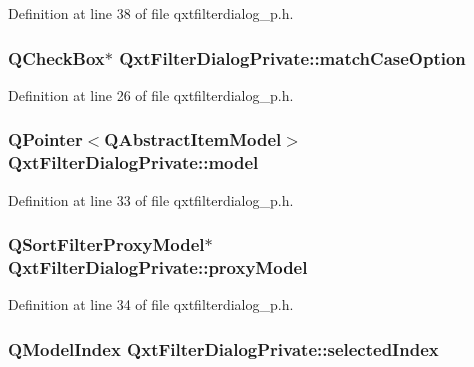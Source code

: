Definition at line 38 of file qxtfilterdialog\-\_\-p.\-h.

\hypertarget{class_qxt_filter_dialog_private_a80eb64e05723317e25a6f5c25a420f56}{
\subsubsection[{match\-Case\-Option}]{\setlength{\rightskip}{0pt plus 5cm}Q\-Check\-Box$\ast$ Qxt\-Filter\-Dialog\-Private\-::match\-Case\-Option}}\label{class_qxt_filter_dialog_private_a80eb64e05723317e25a6f5c25a420f56}


Definition at line 26 of file qxtfilterdialog\-\_\-p.\-h.

\hypertarget{class_qxt_filter_dialog_private_a24103d685cb7f1b6463c3d0b8346d9e2}{
\subsubsection[{model}]{\setlength{\rightskip}{0pt plus 5cm}Q\-Pointer$<$Q\-Abstract\-Item\-Model$>$ Qxt\-Filter\-Dialog\-Private\-::model}}\label{class_qxt_filter_dialog_private_a24103d685cb7f1b6463c3d0b8346d9e2}


Definition at line 33 of file qxtfilterdialog\-\_\-p.\-h.

\hypertarget{class_qxt_filter_dialog_private_a8f46114e5997ecbf8c86b58b1241e426}{
\subsubsection[{proxy\-Model}]{\setlength{\rightskip}{0pt plus 5cm}Q\-Sort\-Filter\-Proxy\-Model$\ast$ Qxt\-Filter\-Dialog\-Private\-::proxy\-Model}}\label{class_qxt_filter_dialog_private_a8f46114e5997ecbf8c86b58b1241e426}


Definition at line 34 of file qxtfilterdialog\-\_\-p.\-h.

\hypertarget{class_qxt_filter_dialog_private_ad84e2abdca94818ab25f96168a481099}{
\subsubsection[{selected\-Index}]{\setlength{\rightskip}{0pt plus 5cm}Q\-Model\-Index Qxt\-Filter\-Dialog\-Private\-::selected\-Index}}\label{class_qxt_filter_dialog_private_ad84e2abdca94818ab25f96168a481099}


